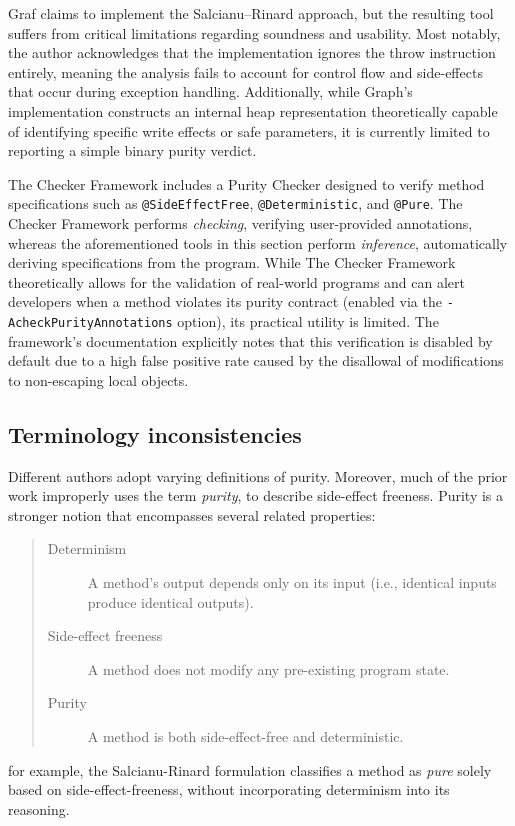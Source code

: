 \documentclass{article}
\begin{document}
Graf \cite{graf2006implementing} claims to implement the Salcianu--Rinard approach, but the resulting tool suffers from critical limitations regarding soundness and usability. Most notably, the author acknowledges that the implementation ignores the throw instruction entirely, meaning the analysis fails to account for control flow and side-effects that occur during exception handling. Additionally, while Graph's implementation constructs an internal heap representation theoretically capable of identifying specific write effects or safe parameters, it is currently limited to reporting a simple binary purity verdict.



The Checker Framework \cite{checkerframework} includes a Purity Checker designed to verify method specifications such as \texttt{@SideEffectFree}, \texttt{@Deterministic}, and \texttt{@Pure}. The Checker Framework performs \emph{checking}, verifying user-provided annotations, whereas the aforementioned tools in this section perform \emph{inference}, automatically deriving specifications from the program. While The Checker Framework theoretically allows for the validation of real-world programs and can alert developers when a method violates its purity contract (enabled via the \texttt{-AcheckPurityAnnotations} option), its practical utility is limited. The framework's documentation explicitly notes that this verification is disabled by default due to a high false positive rate caused by the disallowal of modifications to non-escaping local objects.

\subsection{Terminology inconsistencies}
Different authors adopt varying definitions of purity. Moreover, much of the prior work improperly uses the term \emph{purity}, to describe side-effect freeness. Purity is a stronger notion that encompasses several related properties:

\begin{quote}
\begin{description}
    \item[Determinism] A method's output depends only on its input (i.e., identical inputs produce identical outputs).
    \item[Side-effect freeness] A method does not modify any pre-existing program state.
    \item[Purity] A method is both side-effect-free and deterministic.
\end{description}
\end{quote} for example, the Salcianu-Rinard \cite{salcianu2004combined} formulation classifies a method as \emph{pure} solely based on side-effect-freeness, without incorporating determinism into its reasoning.
\end{document}
